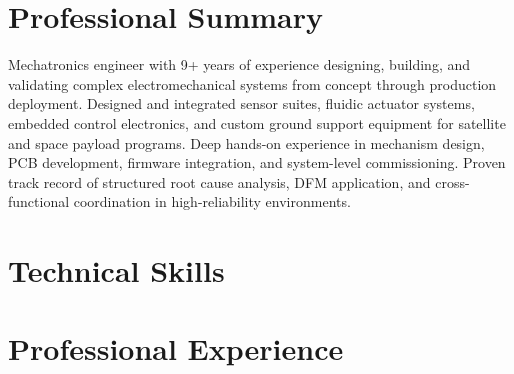 \documentclass[letterpaper,11pt]{moderncv}
\begin{document}
\makecvtitle
\vspace{-3em}

\section{Professional Summary}
Mechatronics engineer with 9+ years of experience designing, building, and validating complex electromechanical systems from concept through production deployment. Designed and integrated sensor suites, fluidic actuator systems, embedded control electronics, and custom ground support equipment for satellite and space payload programs. Deep hands-on experience in mechanism design, PCB development, firmware integration, and system-level commissioning. Proven track record of structured root cause analysis, DFM application, and cross-functional coordination in high-reliability environments.

\section{Technical Skills}
\begin{minipage}[t]{0.48\textwidth}
\end{minipage}%
\hfill
\begin{minipage}[t]{0.48\textwidth}
\end{minipage}

\section{Professional Experience}
\end{document}
